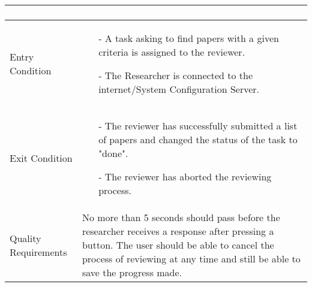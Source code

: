 \begin{center}
\begin{tabular}{ | l | p{10cm} |}
\begin{enumerate}
	    \end{enumerate}\\ \hline
	    Entry Condition & 
	    \begin{enumerate}
		    \item[-] A task asking to find papers with a given criteria is assigned to the reviewer.
		    \item[-] The Researcher is connected to the internet/System Configuration Server.
	    \end{enumerate}
	    \\ \hline
	    Exit Condition &
	   	\begin{enumerate}
	   		\item[-] The reviewer has successfully submitted a list of papers and changed the status of the task to "done".
	   		\item[-] The reviewer has aborted the reviewing process.
	   	\end{enumerate}
	   	\\ \hline
	    Quality Requirements & No more than 5 seconds should pass before the researcher receives a response after pressing a button.
	    The user should be able to cancel the process of reviewing at any time and still be able to save the progress made.\\ \hline
	\end{tabular}
\end{center}

